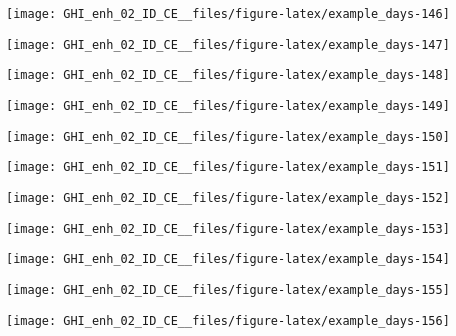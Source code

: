 \documentclass[
  10pt,
  a4paper,oneside]{article}
\begin{document}
\begin{center}\texttt{[image: GHI\_enh\_02\_ID\_CE\_\_files/figure-latex/example\_days-146]} \end{center}

\begin{center}\texttt{[image: GHI\_enh\_02\_ID\_CE\_\_files/figure-latex/example\_days-147]} \end{center}

\begin{center}\texttt{[image: GHI\_enh\_02\_ID\_CE\_\_files/figure-latex/example\_days-148]} \end{center}

\begin{center}\texttt{[image: GHI\_enh\_02\_ID\_CE\_\_files/figure-latex/example\_days-149]} \end{center}

\begin{center}\texttt{[image: GHI\_enh\_02\_ID\_CE\_\_files/figure-latex/example\_days-150]} \end{center}

\begin{center}\texttt{[image: GHI\_enh\_02\_ID\_CE\_\_files/figure-latex/example\_days-151]} \end{center}

\begin{center}\texttt{[image: GHI\_enh\_02\_ID\_CE\_\_files/figure-latex/example\_days-152]} \end{center}

\begin{center}\texttt{[image: GHI\_enh\_02\_ID\_CE\_\_files/figure-latex/example\_days-153]} \end{center}

\begin{center}\texttt{[image: GHI\_enh\_02\_ID\_CE\_\_files/figure-latex/example\_days-154]} \end{center}

\begin{center}\texttt{[image: GHI\_enh\_02\_ID\_CE\_\_files/figure-latex/example\_days-155]} \end{center}

\begin{center}\texttt{[image: GHI\_enh\_02\_ID\_CE\_\_files/figure-latex/example\_days-156]} \end{center}
\end{document}
